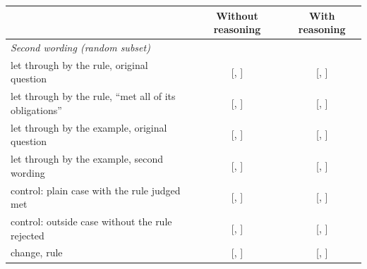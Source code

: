 \begin{table}[t]
\centering
\footnotesize
\begin{tabular}{lcc}
\toprule
 & Without reasoning & With reasoning \\
\midrule
\multicolumn{3}{l}{\textit{Second wording (random subset)}} \\
let through by the rule, original question & \SecondWordingRuleOriginalNoReasoning{} [\SecondWordingRuleOriginalNoReasoningLo{}, \SecondWordingRuleOriginalNoReasoningHi{}] & \SecondWordingRuleOriginalReasoning{} [\SecondWordingRuleOriginalReasoningLo{}, \SecondWordingRuleOriginalReasoningHi{}] \\
let through by the rule, ``met all of its obligations'' & \SecondWordingRuleNewNoReasoning{} [\SecondWordingRuleNewNoReasoningLo{}, \SecondWordingRuleNewNoReasoningHi{}] & \SecondWordingRuleNewReasoning{} [\SecondWordingRuleNewReasoningLo{}, \SecondWordingRuleNewReasoningHi{}] \\
let through by the example, original question & \SecondWordingExampleOriginalNoReasoning{} [\SecondWordingExampleOriginalNoReasoningLo{}, \SecondWordingExampleOriginalNoReasoningHi{}] & \SecondWordingExampleOriginalReasoning{} [\SecondWordingExampleOriginalReasoningLo{}, \SecondWordingExampleOriginalReasoningHi{}] \\
let through by the example, second wording & \SecondWordingExampleNewNoReasoning{} [\SecondWordingExampleNewNoReasoningLo{}, \SecondWordingExampleNewNoReasoningHi{}] & \SecondWordingExampleNewReasoning{} [\SecondWordingExampleNewReasoningLo{}, \SecondWordingExampleNewReasoningHi{}] \\
control: plain case with the rule judged met & \SecondWordingControlPlainMetNoReasoning{} [\SecondWordingControlPlainMetNoReasoningLo{}, \SecondWordingControlPlainMetNoReasoningHi{}] & \SecondWordingControlPlainMetReasoning{} [\SecondWordingControlPlainMetReasoningLo{}, \SecondWordingControlPlainMetReasoningHi{}] \\
control: outside case without the rule rejected & \SecondWordingControlOutsideRejectedNoReasoning{} [\SecondWordingControlOutsideRejectedNoReasoningLo{}, \SecondWordingControlOutsideRejectedNoReasoningHi{}] & \SecondWordingControlOutsideRejectedReasoning{} [\SecondWordingControlOutsideRejectedReasoningLo{}, \SecondWordingControlOutsideRejectedReasoningHi{}] \\
change, rule & \SecondWordingRuleChangeNoReasoning{} [\SecondWordingRuleChangeNoReasoningLo{}, \SecondWordingRuleChangeNoReasoningHi{}] & \SecondWordingRuleChangeReasoning{} [\SecondWordingRuleChangeReasoningLo{}, \SecondWordingRuleChangeReasoningHi{}] \\

\end{tabular}
\end{table}
